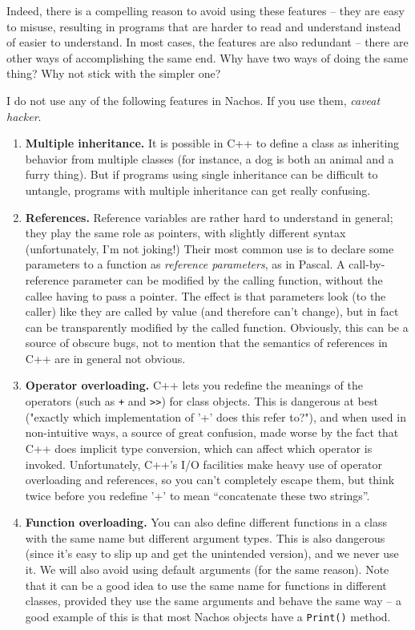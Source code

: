 Indeed, there is a compelling reason to avoid using these features -- they are
easy to misuse, resulting in programs that are harder to read and understand
instead of easier to understand.  In most cases, the features are also
redundant -- there are other ways of accomplishing the same end.  Why have
two ways of doing the same thing?  Why not stick with the simpler one?

I do not use any of the following features in Nachos.
If you use them, {\it caveat hacker}.

\begin{enumerate}

\item {\bf Multiple inheritance.}  It is possible in C++ to define
a class as inheriting behavior from multiple classes (for instance,
a dog is both an animal and a furry thing).  But if programs
using single inheritance can be difficult to untangle, programs
with multiple inheritance can get really confusing.

\item {\bf References.}  Reference variables are rather hard to
understand in general; they play the same role as pointers, with
slightly different syntax (unfortunately, I'm not joking!)
Their most common use is to declare some parameters to a function
as {\it reference parameters}, as in Pascal.  A call-by-reference
parameter can be modified by the calling function, without the callee
having to pass a pointer.  The effect is that parameters look
(to the caller) like they are called by value (and therefore can't change),
but in fact can be transparently modified by the called function.
Obviously, this can be a source of obscure bugs, not to mention
that the semantics of references in C++ are in general not obvious.

\item {\bf Operator overloading.}  C++ lets you redefine the meanings
of the operators (such as {\tt +} and \verb+>>+) for class objects.
This is dangerous at best ("exactly which implementation of '+' does
this refer to?"), and when used in non-intuitive ways, a
source of great confusion, made worse by the fact that C++ does
implicit type conversion, which can affect which operator
is invoked.  Unfortunately, C++'s I/O facilities
make heavy use of operator overloading and references, so you
can't completely escape them, but think twice before you redefine
'+' to mean ``concatenate these two strings''.

\item {\bf Function overloading.}  You can also define different functions
in a class with the same name but different argument types.  This is also
dangerous (since it's easy to slip up and get the unintended version),
and we never use it.  We will also avoid using default arguments (for the
same reason).  Note that it can be a good idea to use the same name for
functions in different classes, provided they use the same
arguments and behave the same way -- a good example of this is that
most Nachos objects have a {\tt Print()} method.


\end{enumerate}
